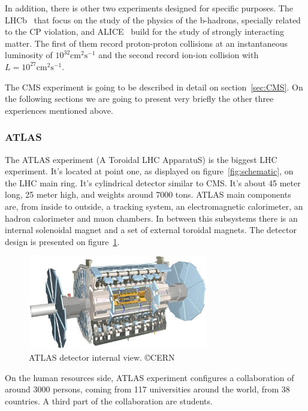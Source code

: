 In addition, there is other two experiments designed for specific purposes. The LHCb~\cite{Alves:2008zz} that focus on the study of the physics of the b-hadrons, specially related to the CP violation, and ALICE~\cite{Cortese:879894} build for the study of strongly interacting matter. The first of them record proton-proton collisions at an instantaneous luminosity of $10^{32}\text{cm}^{2}\text{s}^{-1}$ and the second record ion-ion collision with $L = 10^{27}\text{cm}^{2}\text{s}^{-1}$.

The CMS experiment is going to be described in detail on section~\ref{sec:CMS}. On the following sections we are going to present very briefly the other three experiences mentioned above. 

\subsubsection{ATLAS}
\label{sec:atlas}

The ATLAS experiment (A Toroidal LHC ApparatuS) is the biggest LHC experiment. It's located at point one, as displayed on figure~\ref{fig:schematic}, on the LHC main ring. It's cylindrical detector similar to CMS. It's about 45 meter long, 25 meter high, and weights around 7000 tons. ATLAS main components are, from inside to outside, a tracking system, an electromagnetic calorimeter, an hadron calorimeter and muon chambers. In between this subsystems there is an internal solenoidal magnet and a set of external toroidal magnets. The detector design is presented on figure~\ref{fig:atlasdet}.

\begin{figure}[!Hhtbp]
  \begin{center}
    \includegraphics[width=0.7\textwidth]{figs/atlas_lg.jpg}
    \caption{ATLAS detector internal view. \copyright CERN}
    \label{fig:atlasdet}
  \end{center}
\end{figure}

On the human resources side, ATLAS experiment configures a collaboration of around 3000 persons, coming from 117 universities around the world, from 38 countries. A third part of the collaboration are students.  

